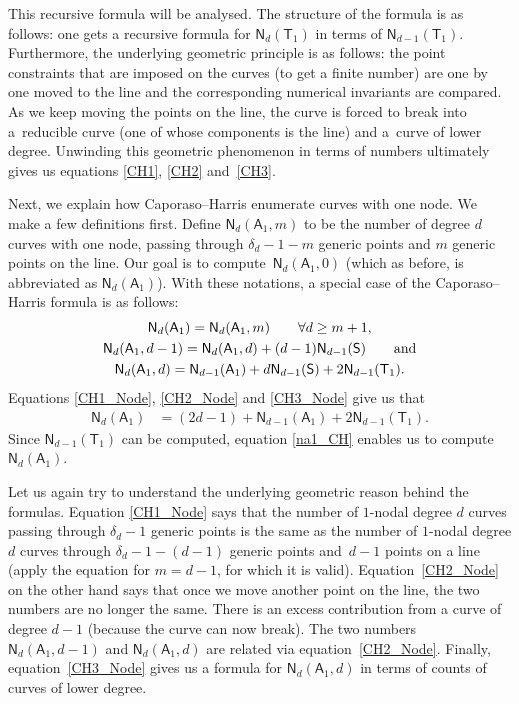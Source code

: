 \documentclass[pdftex]{sigma}
\numberwithin{equation}{section}
\begin{document}
This recursive formula will be analysed.
The structure of the formula is as follows: one gets
a recursive formula for $\mathsf{N}_d(\mathsf{T}_1)$ in terms of
$\mathsf{N}_{d-1}(\mathsf{T}_1)$. Furthermore, the underlying geometric principle is as follows:
the point constraints that are imposed on the curves (to get a finite number) are one by one moved to
the line and the corresponding numerical invariants are compared. As we keep moving the points
on the line, the curve is forced to break into a~reducible curve (one of whose components is the line)
and a~curve of lower degree. Unwinding this geometric phenomenon in terms of numbers ultimately
gives us equations \eqref{CH1}, \eqref{CH2} and~\eqref{CH3}.

Next, we explain how Caporaso--Harris enumerate curves with one node.
We make a few definitions first. Define
$\mathsf{N}_d(\mathsf{A}_1, m)$ to be the number of
degree $d$ curves with one node, passing through $\delta_d-1-m$ generic points and
$m$ generic points on the line.
Our goal is to compute~$\mathsf{N}_d(\mathsf{A}_1, 0)$
(which as before, is abbreviated as $\mathsf{N}_d(\mathsf{A}_1)$).
With these notations, a special case of the Caporaso--Harris
formula \cite[p.~348, Theorem 1.1]{CH}
is as follows:
\begin{gather}
\mathsf{N}_d(\mathsf{A}_1) =
\mathsf{N}_d(\mathsf{A}_1, m) \qquad \forall  d \geq m+1, \label{CH1_Node}\\
\mathsf{N}_d(\mathsf{A}_1, d-1) = \mathsf{N}_d(\mathsf{A}_1, d) + (d-1)\mathsf{N}_{d-1}(\mathsf{S})
\qquad \textnormal{and} \label{CH2_Node} \\
\mathsf{N}_d(\mathsf{A}_1, d) = \mathsf{N}_{d-1}(\mathsf{A}_1) + d \mathsf{N}_{d-1}(\mathsf{S}) + 2 \mathsf{N}_{d-1}(\mathsf{T}_1).
\label{CH3_Node}
\end{gather}
Equations \eqref{CH1_Node}, \eqref{CH2_Node}
and \eqref{CH3_Node} give us that
\begin{align}
\mathsf{N}_d(\mathsf{A}_1) & =  (2d-1) + \mathsf{N}_{d-1}(\mathsf{A}_1) + 2 \mathsf{N}_{d-1}(\mathsf{T}_1). \label{na1_CH}
\end{align}
Since $\mathsf{N}_{d-1}(\mathsf{T}_1)$ can be computed,
equation \eqref{na1_CH} enables us to compute $\mathsf{N}_{d}(\mathsf{A}_1)$.

Let us again try to understand the underlying geometric reason behind the formulas.
Equation \eqref{CH1_Node} says that the number of $1$-nodal
degree $d$ curves
passing through $\delta_d-1$ generic points
is the same as the number of $1$-nodal degree $d$ curves
through $\delta_d-1-(d-1)$ generic points
and~${d-1}$ points on a line (apply the equation for $m=d-1$, for which it is valid).
Equation~\eqref{CH2_Node} on the other hand says that
once we move another point on the line, the two numbers are no longer the same.
There is an excess contribution from a curve of
degree $d-1$ (because the curve can now break).
The two numbers $\mathsf{N}_d(\mathsf{A}_1, d-1)$ and
$\mathsf{N}_d(\mathsf{A}_1, d)$ are related via equation~\eqref{CH2_Node}.
Finally, equation~\eqref{CH3_Node} gives us a formula for
$\mathsf{N}_d(\mathsf{A}_1, d)$ in terms of counts of
curves of lower degree.
\end{document}
